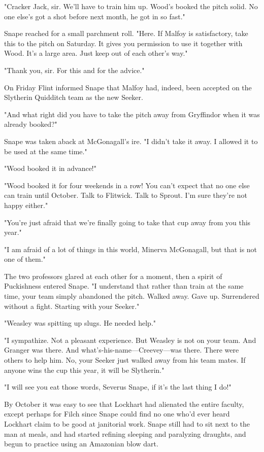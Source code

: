 "Cracker Jack, sir. We'll have to train him up. Wood's booked the pitch solid. No one else's got a shot before next month, he got in so fast."

Snape reached for a small parchment roll. "Here. If Malfoy is satisfactory, take this to the pitch on Saturday. It gives you permission to use it together with Wood. It's a large area. Just keep out of each other's way."

"Thank you, sir. For this and for the advice."

On Friday Flint informed Snape that Malfoy had, indeed, been accepted on the Slytherin Quidditch team as the new Seeker.

\sbreak

"And what right did you have to take the pitch away from Gryffindor when it was already booked?"

Snape was taken aback at McGonagall's ire. "I didn't take it away. I allowed it to be used at the same time."

"Wood booked it in advance!"

"Wood booked it for four weekends in a row! You can't expect that no one else can train until October. Talk to Flitwick. Talk to Sprout. I'm sure they're not happy either."

"You're just afraid that we're finally going to take that cup away from you this year."

"I am afraid of a lot of things in this world, Minerva McGonagall, but that is not one of them."

The two professors glared at each other for a moment, then a spirit of Puckishness entered Snape. "I understand that rather than train at the same time, your team simply abandoned the pitch. Walked away. Gave up. Surrendered without a fight. Starting with your Seeker."

"Weasley was spitting up slugs. He needed help."

"I sympathize. Not a pleasant experience. But Weasley is not on your team. And Granger was there. And what's-his-name—Creevey—was there. There were others to help him. No, your Seeker just walked away from his team mates. If anyone wins the cup this year, it will be Slytherin."

"I will see you eat those words, Severus Snape, if it's the last thing I do!"

\sbreak

By October it was easy to see that Lockhart had alienated the entire faculty, except perhaps for Filch since Snape could find no one who'd ever heard Lockhart claim to be good at janitorial work. Snape still had to sit next to the man at meals, and had started refining sleeping and paralyzing draughts, and begun to practice using an Amazonian blow dart.

